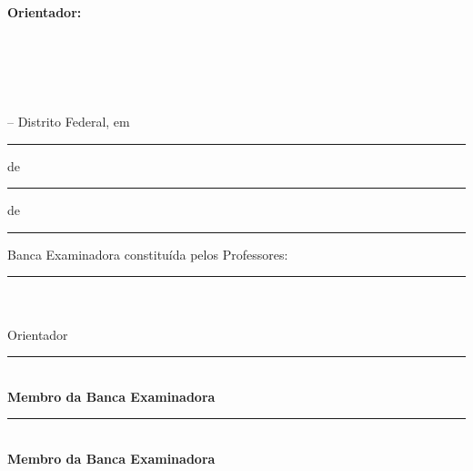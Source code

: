 \documentclass[
	12pt,				%
	a4paper,			%
    openany,            %
    oneside,            %
	english,			%
	spanish,			%
	brazil,				%
	]{abntex2}          %
\begin{document}
\noindent\hspace{.42\textwidth}
\begin{minipage}{.52\textwidth}\raggedright
\imprimirpreambulo\\[0.6em]
\textbf{Orientador:} \imprimirorientador
\end{minipage}

\vfill
\begin{center}
   {\textbf{\Large \imprimirlocal \\ \imprimirdata}}
\end{center}

\clearpage
\thispagestyle{empty}
\begin{center}
    {\textbf{\large \imprimirautor}}\\[1.5cm]
    {\textbf{\LARGE \imprimirtitulo}}\\[3cm]
\end{center}

\hspace{0.85cm}\imprimirpreambulo

\vspace{1cm}

\hspace{0.85cm}\imprimirlocal{} -- Distrito Federal, em \rule{1.5cm}{0.005cm} de \rule{3cm}{0.005cm} de \rule{1.5cm}{0.005cm}

\vspace{3cm}

\hspace{0.85cm}Banca Examinadora constituída pelos Professores:

\vspace{1cm}
\begin{center}
    \rule{10cm}{0.005cm}\\
    \textbf{\imprimirorientador}\\
    Orientador

    \vspace{1cm}
    \rule{10cm}{0.005cm}\\
    \textbf{Membro da Banca Examinadora}

    \vspace{1cm}
    \rule{10cm}{0.005cm}\\
    \textbf{Membro da Banca Examinadora}
\end{center}

\end{document}
